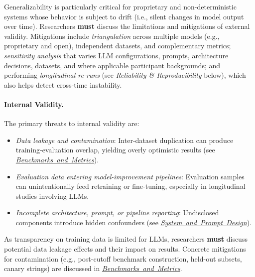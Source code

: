 \documentclass[smallextended]{svjour3}
\newcommand{\must}{\textbf{must}\xspace}
\newcommand{\design}{\hyperref[sec:report-system-and-prompt-design]{\mbox{\emph{System and Prompt Design}}}\xspace}
\newcommand{\benchmarksmetrics}{\hyperref[sec:use-suitable-baselines-benchmarks-and-metrics]{\mbox{\emph{Benchmarks and Metrics}}}\xspace}
\newcommand{\design}{\href{/guidelines/design/}{\emph{System and Prompt Design}}\xspace}
\newcommand{\benchmarksmetrics}{\href{/guidelines/benchmarks-metrics/}{\emph{Benchmarks and Metrics}}\xspace}
\newcommand{\guidelineparagraph}[1]{\paragraph{#1.}}
\newcommand{\guidelineparagraph}[1]{\paragraph{#1}}
\begin{document}
Generalizability is particularly critical for proprietary and non-deterministic systems whose behavior is subject to drift (i.e., silent changes in model output over time). Researchers \must discuss the limitations and mitigations of external validity.
Mitigations include \emph{triangulation} across multiple models (e.g., proprietary and open), independent datasets, and complementary metrics; \emph{sensitivity analysis} that varies LLM configurations, prompts, architecture decisions, datasets, and where applicable participant backgrounds; and performing \emph{longitudinal re-runs} (see \emph{Reliability \& Reproducibility} below), which also helps detect cross-time instability.

\guidelineparagraph{Internal Validity}
The primary threats to internal validity are:
\begin{itemize}
	\item \emph{Data leakage and contamination}: Inter-dataset duplication can produce training-evaluation overlap, yielding overly optimistic results (see \benchmarksmetrics).
	\item \emph{Evaluation data entering model-improvement pipelines}: Evaluation samples can unintentionally feed retraining or fine-tuning, especially in longitudinal studies involving LLMs.
	\item \emph{Incomplete architecture, prompt, or pipeline reporting}: Undisclosed components introduce hidden confounders (see \design).
\end{itemize}

As transparency on training data is limited for LLMs, researchers \must discuss potential data leakage effects and their impact on results. Concrete mitigations for contamination (e.g., post-cutoff benchmark construction, held-out subsets, canary strings) are discussed in \benchmarksmetrics.
\end{document}
